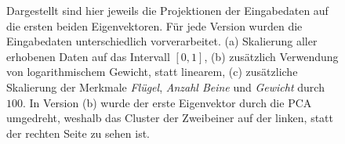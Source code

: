  \begin{figure}
  \qquad
  \qquad
  
  \caption{Dargestellt sind hier jeweils die Projektionen der Eingabedaten auf die ersten beiden Eigenvektoren. Für jede Version wurden die Eingabedaten unterschiedlich vorverarbeitet. (a) Skalierung aller erhobenen Daten auf das Intervall $[0, 1]$, (b) zusätzlich Verwendung von logarithmischem Gewicht, statt linearem, (c) zusätzliche Skalierung der Merkmale \emph{Flügel}, \emph{Anzahl Beine} und \emph{Gewicht} durch $100$. In Version (b) wurde der erste Eigenvektor durch die PCA umgedreht, weshalb das Cluster der Zweibeiner auf der linken, statt der rechten Seite zu sehen ist.}
  \label{projections_scales}
 \end{figure}
 

